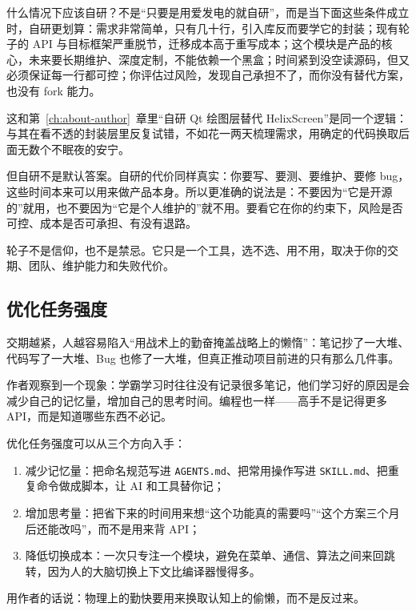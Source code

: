 什么情况下应该自研？不是“只要是用爱发电的就自研”，而是当下面这些条件成立时，自研更划算：需求非常简单，只有几十行，引入库反而要学它的封装；现有轮子的 API 与目标框架严重脱节，迁移成本高于重写成本；这个模块是产品的核心，未来要长期维护、深度定制，不能依赖一个黑盒；时间紧到没空读源码，但又必须保证每一行都可控；你评估过风险，发现自己承担不了，而你没有替代方案，也没有 fork 能力。

这和第~\ref{ch:about-author}~章里“自研 Qt 绘图层替代 HelixScreen”是同一个逻辑：与其在看不透的封装层里反复试错，不如花一两天梳理需求，用确定的代码换取后面无数个不眠夜的安宁。

但自研不是默认答案。自研的代价同样真实：你要写、要测、要维护、要修 bug，这些时间本来可以用来做产品本身。所以更准确的说法是：不要因为“它是开源的”就用，也不要因为“它是个人维护的”就不用。要看它在你的约束下，风险是否可控、成本是否可承担、有没有退路。

轮子不是信仰，也不是禁忌。它只是一个工具，选不选、用不用，取决于你的交期、团队、维护能力和失败代价。

\subsection{优化任务强度}

交期越紧，人越容易陷入“用战术上的勤奋掩盖战略上的懒惰”：笔记抄了一大堆、代码写了一大堆、Bug 也修了一大堆，但真正推动项目前进的只有那么几件事。

作者观察到一个现象：学霸学习时往往没有记录很多笔记，他们学习好的原因是会减少自己的记忆量，增加自己的思考时间。编程也一样——高手不是记得更多 API，而是知道哪些东西不必记。

优化任务强度可以从三个方向入手：

\begin{enumerate}
\item 减少记忆量：把命名规范写进 \texttt{AGENTS.md}、把常用操作写进 \texttt{SKILL.md}、把重复命令做成脚本，让 AI 和工具替你记；
\item 增加思考量：把省下来的时间用来想“这个功能真的需要吗”“这个方案三个月后还能改吗”，而不是用来背 API；
\item 降低切换成本：一次只专注一个模块，避免在菜单、通信、算法之间来回跳转，因为人的大脑切换上下文比编译器慢得多。
\end{enumerate}

用作者的话说：物理上的勤快要用来换取认知上的偷懒，而不是反过来。

